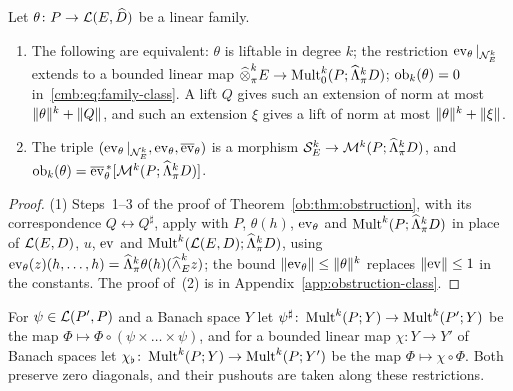 \begin{theorem}\label{cmb:thm:family}
Let $\theta\colon P\to\mathcal L(E,\widehat D)$ be a linear family.
\begin{enumerate}
\item The following are equivalent: $\theta$ is liftable in degree $k$; the restriction $\operatorname{ev}_\theta|_{\mathcal N^k_E}$ extends to a
bounded linear map $\widehat\otimes^k_\pi E\to\operatorname{Mult}^k_0(P;\widehat\Lambda^k_\pi D)$; $\operatorname{ob}_k(\theta)=0$
in~\eqref{cmb:eq:family-class}. A lift $Q$ gives such
an extension of norm at most $\lVert \theta\rVert^k+\lVert Q\rVert$, and such an extension $\xi$ gives a lift of norm at most
$\lVert \theta\rVert^k+\lVert \xi\rVert$.
\item The triple $(\operatorname{ev}_\theta|_{\mathcal N^k_E},\operatorname{ev}_\theta,\overline{\operatorname{ev}}_\theta)$ is a morphism
$\mathcal S^k_E\to\mathcal M^k(P;\widehat\Lambda^k_\pi D)$, and $\operatorname{ob}_k(\theta)=\overline{\operatorname{ev}}_\theta^{\,*}[\mathcal M^k(P;\widehat\Lambda^k_\pi D)]$.
\end{enumerate}
\end{theorem}

\begin{proof}
(1) Steps~1--3 of the proof of Theorem~\ref{ob:thm:obstruction}, with its correspondence $Q\leftrightarrow Q^\sharp$,
apply with $P$, $\theta(h)$, $\operatorname{ev}_\theta$ and $\operatorname{Mult}^k(P;\widehat\Lambda^k_\pi D)$ in place of $\mathcal L(E,D)$, $u$, $\operatorname{ev}$ and
$\operatorname{Mult}^k(\mathcal L(E,D);\widehat\Lambda^k_\pi D)$, using $\operatorname{ev}_\theta(z)(h,\dots,h)=\widehat\Lambda^k_\pi\theta(h)(\widehat\wedge^k_Ez)$;
the bound $\lVert \operatorname{ev}_\theta\rVert\le\lVert \theta\rVert^k$ replaces $\lVert \operatorname{ev}\rVert\le1$ in the constants. The proof of~(2) is in
Appendix~\ref{app:obstruction-class}.
\end{proof}

For $\psi\in\mathcal L(P',P)$ and a Banach space $Y$ let $\psi^\sharp\colon\operatorname{Mult}^k(P;Y)\to\operatorname{Mult}^k(P';Y)$ be the map
$\Phi\mapsto\Phi\circ(\psi\times\dots\times\psi)$, and for a bounded linear map $\chi\colon Y\to Y'$ of Banach spaces let
$\chi_\flat\colon\operatorname{Mult}^k(P;Y)\to\operatorname{Mult}^k(P;Y')$ be the map $\Phi\mapsto\chi\circ\Phi$. Both preserve zero diagonals, and their
pushouts are taken along these restrictions.

